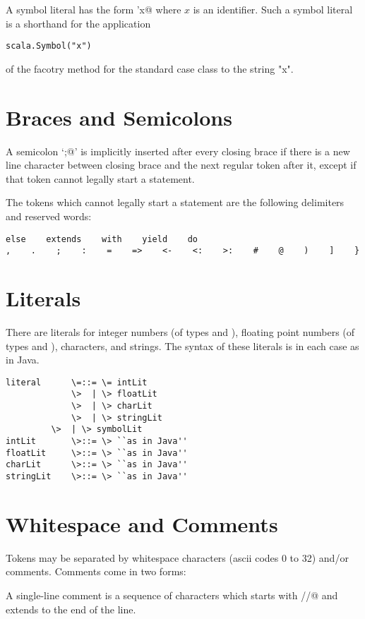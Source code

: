 \documentclass[11pt]{report}
\begin{document}
A symbol literal has the form \verb@'x@ where $x$ is an identifier.
Such a symbol literal is a  shorthand for the application
\begin{verbatim}
scala.Symbol("x")
\end{verbatim}
of the facotry method for the standard case class \verb@Symbol@ to the string "x".

\section{Braces and Semicolons}

A semicolon `\verb@;@' is implicitly inserted after every closing brace
if there is a new line character between closing brace and the next
regular token after it, except if that token cannot legally start a
statement.

The tokens which cannot legally start a statement
are the following delimiters and reserved words:
\begin{verbatim}
else    extends    with    yield    do
,    .    ;    :    =    =>    <-    <:    >:    #    @    )    ]    }
\end{verbatim}

\section{Literals}

There are literals for integer numbers (of types \verb@Int@ and \verb@Long@),
floating point numbers (of types \verb@Float@ and \verb@Double@), characters, and
strings.  The syntax of these literals is in each case as in Java.

\syntax\begin{verbatim}
literal      \=::= \= intLit
             \>  | \> floatLit
             \>  | \> charLit
             \>  | \> stringLit
	     \>  | \> symbolLit
intLit       \>::= \> ``as in Java''
floatLit     \>::= \> ``as in Java''
charLit      \>::= \> ``as in Java''
stringLit    \>::= \> ``as in Java''
\end{verbatim}

\section{Whitespace and Comments}

Tokens may be separated by whitespace characters (ascii codes 0 to 32)
and/or comments. Comments come in two forms:

A single-line comment is a sequence of characters which starts with
\verb@//@ and extends to the end of the line.
\end{document}
